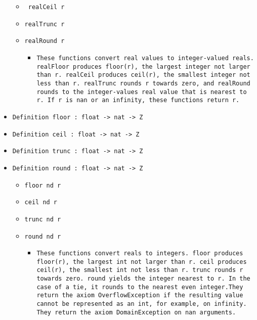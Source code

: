 \documentclass[11pt]{report}
\begin{document}
\begin{itemize}
\begin{itemize}
\item \texttt{ realCeil r}

\item  \texttt{realTrunc r}

\item  \texttt{realRound r}

\begin{itemize}
\item  \begin{flushleft} \texttt{These functions convert real values to integer-valued reals. realFloor produces floor(r), the largest integer not larger than r. realCeil produces ceil(r), the smallest integer not less than r. realTrunc rounds r towards zero, and realRound rounds to the integer-values real value that is nearest to r. If r is nan or an infinity, these functions return r.} \end{flushleft}

\end{itemize}

\end{itemize}

\item  \texttt{Definition floor : float -> nat -> Z}

\item  \texttt{Definition ceil : float -> nat -> Z}

\item  \texttt{Definition trunc : float -> nat -> Z}

\item  \texttt{Definition round : float -> nat -> Z}

\begin{itemize}
\item  \texttt{floor nd r}

\item  \texttt{ceil nd r}

\item  \texttt{trunc nd r}

\item  \texttt{round nd r}

\begin{itemize}
\item  \begin{flushleft} \texttt{These functions convert reals to integers. floor produces floor(r), the largest int not larger than r. ceil produces ceil(r), the smallest int not less than r. trunc rounds r towards zero. round yields the integer nearest to r. In the case of a tie, it rounds to the nearest even integer.They return the axiom OverflowException if the resulting value cannot be represented as an int, for example, on infinity. They return the axiom DomainException on nan arguments. } \end{flushleft}


\end{itemize}
\end{itemize}
\end{itemize}
\end{document}
